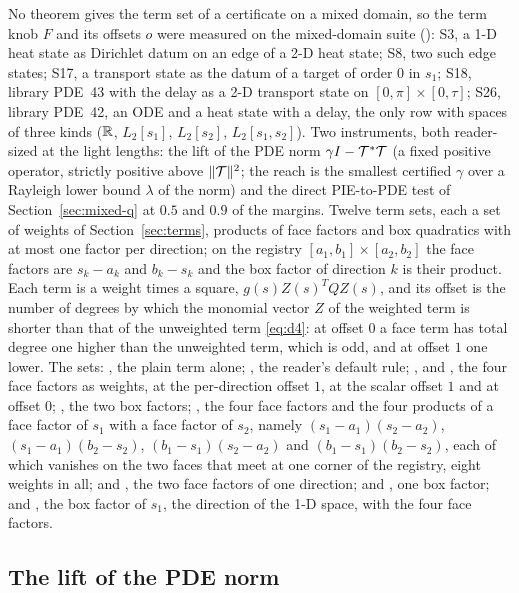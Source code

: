No theorem gives the term set of a certificate on a mixed domain, so the term knob $F$ and its offsets $o$ were measured on the mixed-domain suite (): S3, a 1-D heat state as Dirichlet datum on an edge of a 2-D heat state; S8, two such edge states; S17, a transport state as the datum of a target of order $0$ in $s_1$; S18, library PDE~43 with the delay as a 2-D transport state on $[0,\pi]\times[0,\tau]$; S26, library PDE~42, an ODE and a heat state with a delay, the only row with spaces of three kinds ($\mathbb{R}$, $L_2[s_1]$, $L_2[s_2]$, $L_2[s_1,s_2]$). Two instruments, both reader-sized at the light lengths: the lift of the PDE norm $\gamma I-\mathcal{T}^*\mathcal{T}$ (a fixed positive operator, strictly positive above $\|\mathcal{T}\|^2$; the reach is the smallest certified $\gamma$ over a Rayleigh lower bound $\lambda$ of the norm) and the direct PIE-to-PDE test of Section~\ref{sec:mixed-q} at $0.5$ and $0.9$ of the margins. Twelve term sets, each a set of weights of Section~\ref{sec:terms}, products of face factors and box quadratics with at most one factor per direction; on the registry $[a_1,b_1]\times[a_2,b_2]$ the face factors are $s_k-a_k$ and $b_k-s_k$ and the box factor of direction $k$ is their product. Each term is a weight times a square, $g(s)Z(s)^TQZ(s)$, and its offset is the number of degrees by which the monomial vector $Z$ of the weighted term is shorter than that of the unweighted term \eqref{eq:d4}: at offset $0$ a face term has total degree one higher than the unweighted term, which is odd, and at offset $1$ one lower. The sets: , the plain term alone; , the reader's default rule; ,  and , the four face factors as weights, at the per-direction offset $1$, at the scalar offset $1$ and at offset $0$; , the two box factors; , the four face factors and the four products of a face factor of $s_1$ with a face factor of $s_2$, namely $(s_1-a_1)(s_2-a_2)$, $(s_1-a_1)(b_2-s_2)$, $(b_1-s_1)(s_2-a_2)$ and $(b_1-s_1)(b_2-s_2)$, each of which vanishes on the two faces that meet at one corner of the registry, eight weights in all;  and , the two face factors of one direction;  and , one box factor; and , the box factor of $s_1$, the direction of the 1-D space, with the four face factors.

\subsection{The lift of the PDE norm}\label{sec:t1}

